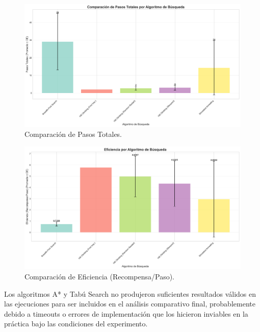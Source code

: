 \documentclass[12pt, oneside, openany]{book}
\begin{document}
\begin{figure}[H]
    \includegraphics[width=1\textwidth]{search_pasos_comparacion.png}
    \caption{Comparación de Pasos Totales.}
    \label{fig:search_pasos}
\end{figure}
\begin{figure}[H]
    \includegraphics[width=1\textwidth]{search_eficiencia_comparacion.png}
    \caption{Comparación de Eficiencia (Recompensa/Paso).}
    \label{fig:search_eficiencia}
\end{figure}

Los algoritmos A* y Tabú Search no produjeron suficientes resultados válidos en las ejecuciones para ser incluidos en el análisis comparativo final, probablemente debido a timeouts o errores de implementación que los hicieron inviables en la práctica bajo las condiciones del experimento.
\end{document}
